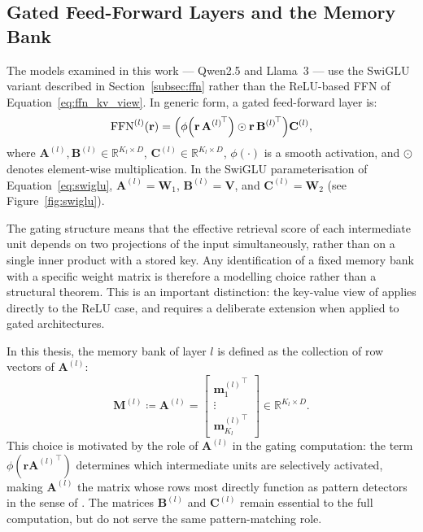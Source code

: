 \subsection{Gated Feed-Forward Layers and the Memory Bank}
\label{subsec:gated_ffn_memory}

The models examined in this work — Qwen2.5 and Llama~3 — use the SwiGLU variant
described in Section~\ref{subsec:ffn} rather than the ReLU-based FFN of
Equation~\ref{eq:ffn_kv_view}. In generic form, a gated feed-forward layer is:
\begin{equation}
    \mathrm{FFN}^{(l)}(\mathbf{r})
    =
    \Bigl(
        \phi\!\left(\mathbf{r}\,{\mathbf{A}^{(l)}}^{\!\top}\right)
        \odot
        \mathbf{r}\,{\mathbf{B}^{(l)}}^{\!\top}
    \Bigr)\mathbf{C}^{(l)},
    \label{eq:gated_ffn_generic}
\end{equation}
where $\mathbf{A}^{(l)}, \mathbf{B}^{(l)} \in \mathbb{R}^{K_l \times D}$,
$\mathbf{C}^{(l)} \in \mathbb{R}^{K_l \times D}$, $\phi(\cdot)$ is a smooth
activation, and $\odot$ denotes element-wise multiplication. In the SwiGLU
parameterisation of Equation~\ref{eq:swiglu}, $\mathbf{A}^{(l)} = \mathbf{W}_1$,
$\mathbf{B}^{(l)} = \mathbf{V}$, and $\mathbf{C}^{(l)} = \mathbf{W}_2$ (see
Figure~\ref{fig:swiglu}).

The gating structure means that the effective retrieval score of each intermediate
unit depends on two projections of the input simultaneously, rather than on a single
inner product with a stored key. Any identification of a fixed memory bank with a
specific weight matrix is therefore a modelling choice rather than a structural
theorem. This is an important distinction: the key-value view of
\citet{geva2021transformer} applies directly to the ReLU case, and requires a
deliberate extension when applied to gated architectures.

In this thesis, the memory bank of layer $l$ is defined as the collection of row
vectors of $\mathbf{A}^{(l)}$:
\begin{equation}
    \mathbf{M}^{(l)} \coloneqq \mathbf{A}^{(l)}
    =
    \begin{bmatrix}
        {\mathbf{m}_1^{(l)}}^{\!\top} \\
        \vdots \\
        {\mathbf{m}_{K_l}^{(l)}}^{\!\top}
    \end{bmatrix}
    \in \mathbb{R}^{K_l \times D}.
    \label{eq:memory_bank_definition}
\end{equation}
This choice is motivated by the role of $\mathbf{A}^{(l)}$ in the gating
computation: the term $\phi(\mathbf{r}{\mathbf{A}^{(l)}}^{\!\top})$ determines
which intermediate units are selectively activated, making $\mathbf{A}^{(l)}$ the
matrix whose rows most directly function as pattern detectors in the sense of
\citet{geva2021transformer}. The matrices $\mathbf{B}^{(l)}$ and $\mathbf{C}^{(l)}$
remain essential to the full computation, but do not serve the same pattern-matching
role.

